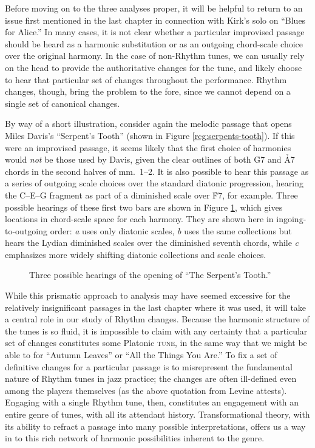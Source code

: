 Before moving on to the three analyses proper, it will be helpful to return to
an issue first mentioned in the last chapter in connection with Kirk's solo on
``Blues for Alice.'' In many cases, it is not clear whether a particular
improvised passage should be heard as a harmonic substitution or as an
outgoing chord-scale choice over the original harmony. In the case of
non-Rhythm tunes, we can usually rely on the head to provide the authoritative
changes for the tune, and likely choose to hear that particular set of changes
throughout the performance. Rhythm changes, though, bring the problem to the
fore, since we cannot depend on a single set of canonical changes.

By way of a short illustration, consider again the melodic passage that opens
Miles Davis's ``Serpent's Tooth'' (shown in Figure \ref{rcg:serpents-tooth}).
If this were an improvised passage, it seems likely that the first choice of
harmonies would \emph{not} be those used by Davis, given the clear
outlines of both \h{G7} and \h{A7} chords in the second halves of
mm.~1--2. It is also possible to hear this passage as a series of outgoing
scale choices over the standard diatonic progression, hearing the
C\sharp--E--G fragment as part of a diminished scale over \h{F7}, for example.
Three possible hearings of these first two bars are shown in Figure
\ref{rcg:serpents-ambiguous}, which gives locations in chord-scale space for
each harmony. They are shown here in ingoing-to-outgoing order: \emph{a} uses
only diatonic scales, \emph{b} uses the same collections but hears the Lydian
diminished scales over the diminished seventh chords, while \emph{c}
emphasizes more widely shifting diatonic collections and scale choices.

\begin{figure}[tbp]
  \caption{Three possible hearings of the opening of ``The Serpent's Tooth.''}
  \label{rcg:serpents-ambiguous}
\end{figure}

While this prismatic approach to analysis may have seemed excessive for the
relatively insignificant passages in the last chapter where it was used, it
will take a central role in our study of Rhythm changes. Because the harmonic
structure of the tunes is so fluid, it is impossible to claim with any
certainty that a particular set of changes constitutes some Platonic
\textsc{tune}, in the same way that we might be able to for ``Autumn Leaves''
or ``All the Things You Are.'' To fix a set of definitive changes for a
particular passage is to misrepresent the fundamental nature of Rhythm tunes
in jazz practice; the changes are often ill-defined even among the players
themselves (as the above quotation from Levine attests). Engaging
with a single Rhythm tune, then, constitutes an engagement with an entire
genre of tunes, with all its attendant history. Transformational
theory, with its ability to refract a passage into many possible
interpretations, offers us a way in to this rich network of harmonic
possibilities inherent to the genre.

